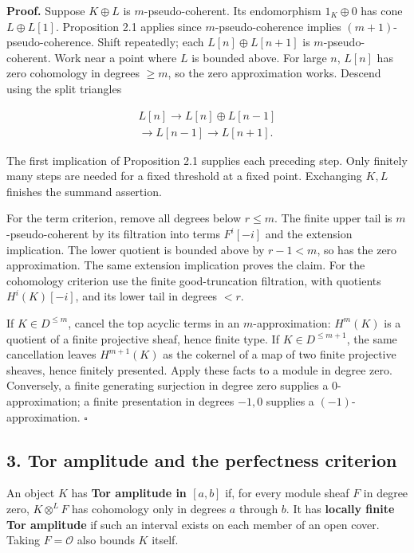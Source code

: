 \documentclass[
  english,
  11pt,
  a4paper,
]{article}
\begin{document}
\textbf{Proof.} Suppose \(K\oplus L\) is \(m\)-pseudo-coherent. Its
endomorphism \(1_K\oplus0\) has cone \(L\oplus L[1]\). Proposition 2.1
applies since \(m\)-pseudo-coherence implies \((m+1)\)-pseudo-coherence.
Shift repeatedly; each \(L[n]\oplus L[n+1]\) is \(m\)-pseudo-coherent.
Work near a point where \(L\) is bounded above. For large \(n\),
\(L[n]\) has zero cohomology in degrees \(\ge m\), so the zero
approximation works. Descend using the split triangles

\[\begin{gathered}
L[n]\longrightarrow L[n]\oplus L[n-1]\\
\longrightarrow L[n-1]\longrightarrow L[n+1].
\end{gathered}
\tag{2.2}\]

The first implication of Proposition 2.1 supplies each preceding step.
Only finitely many steps are needed for a fixed threshold at a fixed
point. Exchanging \(K,L\) finishes the summand assertion.

For the term criterion, remove all degrees below \(r\le m\). The finite
upper tail is \(m\)-pseudo-coherent by its filtration into terms
\(F^i[-i]\) and the extension implication. The lower quotient is bounded
above by \(r-1<m\), so has the zero approximation. The same extension
implication proves the claim. For the cohomology criterion use the
finite good-truncation filtration, with quotients \(H^i(K)[-i]\), and
its lower tail in degrees \(<r\).

If \(K\in D^{\le m}\), cancel the top acyclic terms in an
\(m\)-approximation: \(H^m(K)\) is a quotient of a finite projective
sheaf, hence finite type. If \(K\in D^{\le m+1}\), the same cancellation
leaves \(H^{m+1}(K)\) as the cokernel of a map of two finite projective
sheaves, hence finitely presented. Apply these facts to a module in
degree zero. Conversely, a finite generating surjection in degree zero
supplies a \(0\)-approximation; a finite presentation in degrees
\(-1,0\) supplies a \((-1)\)-approximation. \(\square\)

\subsection{3. Tor amplitude and the perfectness
criterion}\label{perfect-complexes-and-duals--3-tor-amplitude-and-the-perfectness-criterion}

An object \(K\) has \textbf{Tor amplitude in \([a,b]\)} if, for every
module sheaf \(F\) in degree zero, \(K\otimes^L F\) has cohomology only
in degrees \(a\) through \(b\). It has \textbf{locally finite Tor
amplitude} if such an interval exists on each member of an open cover.
Taking \(F=\mathcal O\) also bounds \(K\) itself.
\end{document}
